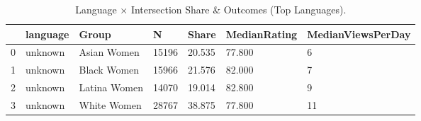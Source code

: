 \begin{table}[htbp]
\centering
\caption{Language × Intersection Share & Outcomes (Top Languages).}
\label{tab:eda_language_by_intersection}
\begin{tabular}{lllllll}
\toprule
 & language & Group & N & Share & MedianRating & MedianViewsPerDay \\
\midrule
0 & unknown & Asian Women & 15196 & 20.535 & 77.800 & 6 \\
1 & unknown & Black Women & 15966 & 21.576 & 82.000 & 7 \\
2 & unknown & Latina Women & 14070 & 19.014 & 82.800 & 9 \\
3 & unknown & White Women & 28767 & 38.875 & 77.800 & 11 \\
\bottomrule
\end{tabular}

\end{table}